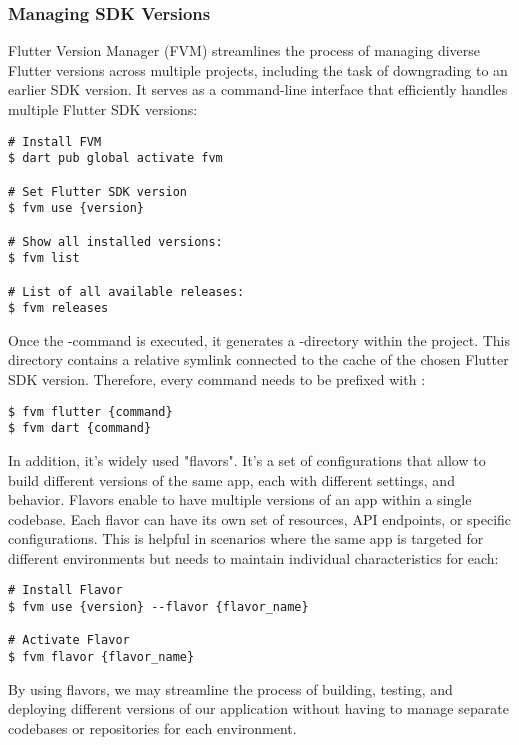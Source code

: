 \newpage
\subsubsection{Managing SDK Versions} \label{sdk}

Flutter Version Manager (FVM) streamlines the process of managing diverse Flutter versions across multiple projects, 
including the task of downgrading to an earlier SDK version. It serves as a command-line interface that efficiently 
handles multiple Flutter SDK versions:

\begin{lstlisting}[language=terminal]
# Install FVM 
$ dart pub global activate fvm

# Set Flutter SDK version
$ fvm use {version}

# Show all installed versions:
$ fvm list

# List of all available releases: 
$ fvm releases
\end{lstlisting}

\noindent Once the -command is executed, it generates a -directory within the project. This directory 
contains a relative symlink connected to the cache of the chosen Flutter SDK version. Therefore, every command needs to 
be prefixed with :

\begin{lstlisting}[language=terminal]
$ fvm flutter {command}
$ fvm dart {command}
\end{lstlisting}

\noindent In addition, it's widely used "flavors". It's a set of configurations that allow to build different versions
of the same app, each with different settings, and behavior. Flavors enable to have multiple versions of an app within 
a single codebase. Each flavor can have its own set of resources, API endpoints, or specific configurations. This is 
helpful in scenarios where the same app is targeted for different environments but needs to maintain individual 
characteristics for each:

\begin{lstlisting}[language=terminal]
# Install Flavor
$ fvm use {version} --flavor {flavor_name}

# Activate Flavor
$ fvm flavor {flavor_name}
\end{lstlisting}

\noindent By using flavors, we may streamline the process of building, testing, and deploying different versions of 
our application without having to manage separate codebases or repositories for each environment.


